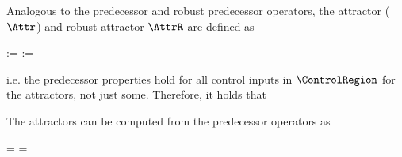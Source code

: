 \stopsection


\startsubsection[title={Attractors}]

    Analogous to the predecessor and robust predecessor operators, the attractor ($\Attr$) and robust attractor $\AttrR$ are defined as

    \startformula
        \startalign[n=2,align={right,left}]
            \NC {} :=
            \NC {} \EndAnd
            \NR
            \NC {} :=
            \NC {} \EndComma
            \NR
        \stopalign
    \stopformula

    i.e. the predecessor properties hold for all control inputs in $\ControlRegion$ for the attractors, not just some.
    Therefore, it holds that

    \startformula
        \startalign[n=2,align={right,left}]
            \NC {} \subseteq
            \NC {} \EndComma
            \NR
            \NC {} \subseteq
            \NC {} \EndAnd
            \NR
            \NC {} \subseteq
            \NC {} \EndPeriod
            \NR
        \stopalign
    \stopformula

    The attractors can be computed from the predecessor operators as

    \startformula
        \startalign[n=2,align={right,left}]
            \NC {} =
            \NC \StateRegion \setminus {} \EndComma
            \NR
            \NC {} =
            \NC \StateRegion \setminus {} \EndPeriod
            \NR
        \stopalign
    \stopformula

\stopsection


